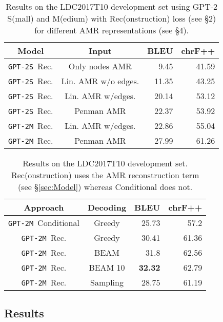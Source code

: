 \documentclass[11pt,a4paper]{article}
\newcommand{\GPTs}{\texttt{GPT-2S}}
\newcommand{\GPTm}{\texttt{GPT-2M}}
\begin{document}
\begin{table}[t]
    \centering
    \fontsize{10pt}{12pt}\selectfont
    \setlength{\tabcolsep}{2.0pt}
    \begin{tabular}{c|c||r|r}
 Model   & Input                          &BLEU & chrF++ \\ \hline \hline
\GPTs~Rec.& Only nodes AMR 	             &9.45 	& 41.59 \\
\GPTs~Rec.& Lin. AMR w/o edges.  &11.35 & 43.25 \\
\GPTs~Rec.& Lin. AMR w/edges. 	 &20.14 & 53.12 \\
\GPTs~Rec.& Penman AMR 	                 &22.37 & 53.92 \\ \hline
\GPTm~Rec.& Lin. AMR w/edges.  &22.86 & 55.04 \\
\GPTm~Rec.& Penman AMR 	 &27.99 & 61.26
    \end{tabular}
    \caption{Results on the LDC2017T10 development set using GPT-2 S(mall) and M(edium) with Rec(onstruction) loss (see \S2) for different AMR representations (see \S4).}
    
    \label{tab:representation_results}
\end{table}{}

\begin{table}[t]
    \centering
    \fontsize{10pt}{12pt}\selectfont
    \setlength{\tabcolsep}{2.0pt}
    \begin{tabular}{c|c||r|r}
Approach  & Decoding & BLEU & chrF++ \\ \hline \hline  
\GPTm~Conditional         &Greedy   & 25.73 & 57.2 \\\hline
\GPTm~Rec.              &Greedy   & 30.41 & 61.36 \\
\GPTm~Rec.              &BEAM     & 31.8 	& 62.56 \\
\GPTm~Rec.              &BEAM 10  & \textbf{32.32} & 62.79 \\
\GPTm~Rec.              &Sampling & 28.75 & 61.19
    \end{tabular}
    \caption{Results on the LDC2017T10 development set. Rec(onstruction) uses the AMR reconstruction term (see \S\ref{sec:Model}) whereas Conditional does not.}
    \label{tab:decoding_res}
\end{table}{}

\subsection{Results}
\label{subsec:results}
\end{document}
